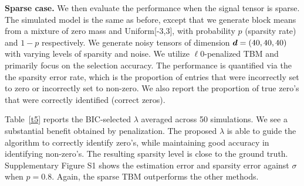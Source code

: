 \documentclass{article}
\begin{document}
\textbf{Sparse case.} We then evaluate the performance when the signal tensor is sparse. The simulated model is the same as before, except that we generate block means from a mixture of zero mass and Uniform[-3,3], with probability $p$ (sparsity rate) and $1-p$ respectively. We generate noisy tensors of dimension $\bm{d}=(40,40,40)$ with varying levels of sparsity and noise. We utilize $\ell0$-penalized TBM and primarily focus on the selection accuracy. 
The performance is quantified via the the sparsity error rate, which is the proportion of entries that were incorrectly set to zero or incorrectly set to non-zero. We also report the proportion of true zero's that were correctly identified (correct zeros). 

Table~\ref{t5} reports the BIC-selected $\lambda$ averaged across 50 simulations. We see a substantial benefit obtained by penalization. The proposed $\lambda$ is able to guide the algorithm to correctly identify zero's, while maintaining good accuracy in identifying non-zero's. The resulting sparsity level is close to the ground truth. Supplementary Figure S1 shows the estimation error and sparsity error against $\sigma$ when $p=0.8$. Again, the sparse TBM outperforms the other methods. 



\end{document}
